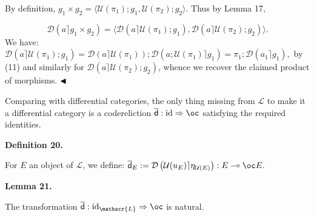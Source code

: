 By definition, $g_{1}\times g_{2}=\langle\mathcal{U}(\pi_{1});g_{1},\mathcal{U}(\pi_{2});g_{2}\rangle$. Thus by Lemma 17,\par
    \[\mathcal{D}\left(a\rceil g_{1}\times g_{2}\right)=\langle\mathcal{D}\left(a\rceil\mathcal{U}(\pi_{1});g_{1}\right),\mathcal{D}\left(a\rceil\mathcal{U}(\pi_{2});g_{2}\right)\rangle.\]    
We have: $\mathcal{D}\left(a\rceil\mathcal{U}(\pi_{1});g_{1}\right)=\mathcal{D}\left(a\rceil\mathcal{U}(\pi_{1})\right);\mathcal{D}\left(a;\mathcal{U}(\pi_{1})\rceil g_{1}\right)=\pi_{1};\mathcal{D}\left(a_{1}\rceil g_{1}\right),$ by (11) and similarly for $\mathcal{D}\left(a\rceil\mathcal{U}(\pi_{2});g_{2}\right)$, whence we recover the claimed product of morphisms. $\hfill\blacktriangleleft$\par
 
 
 
Comparing with differential categories, the only thing missing from $\mathscr{L}$ to make it a differential category is a codereliction $\overline{\mathsf{d}}:\operatorname{id}\Rightarrow\oc$ satisfying the required identities.\par
 
 
 
\par\medskip\noindent\textbf{Definition 20.}\par
 
 
For $E$ an object of $\mathscr{L}$, we define: $\overline{\mathsf{d}}_{E}:=\mathcal{D}\left(\mathcal{U}(u_{E})\rceil\eta_{\mathcal{U}(E)}\right):E\multimap\oc E.$\par
 
 
 
 
\par\medskip\noindent\textbf{Lemma 21.}\par
 
 
The transformation $\overline{\mathsf{d}}:\operatorname{id}_{\mathscr{L}}\Rightarrow\oc$ is natural.\par
 
 
 

